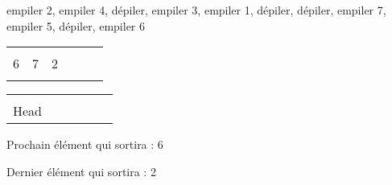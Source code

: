 \documentclass[11pt,a4paper]{article}
\begin{document}
\begin{center}

\begin{large}
empiler 2, empiler 4, dépiler, empiler 3, empiler 1, dépiler, dépiler, empiler 7, empiler 5, dépiler, empiler 6
\end{large}


\bigskip

\begin{tabular}{ | C{1cm} | C{1cm} | C{1cm} | C{1cm} | C{1cm} | C{1cm} | }
  \hline
     &    &    &  &  &  \\
   6 &  7 &  2 &  &  &  \\
     &    &    &  &  &  \\
  \hline
\end{tabular}

\smallskip

\begin{tabular}{   C{1cm}   C{1cm}   C{1cm}   C{1cm}   C{1cm}   C{1cm}   }
   &  &  &  &  &  \\
  Head &  &  &  &  &  \\
\end{tabular}






\begin{table}[ht!]
  \begin{minipage}{0.50\textwidth}

Prochain élément qui sortira : 6

  \end{minipage}
  \hfillx
  \begin{minipage}{0.50\textwidth}

Dernier élément qui sortira : 2

  \end{minipage}
\end{table}
\end{center}
\end{document}
